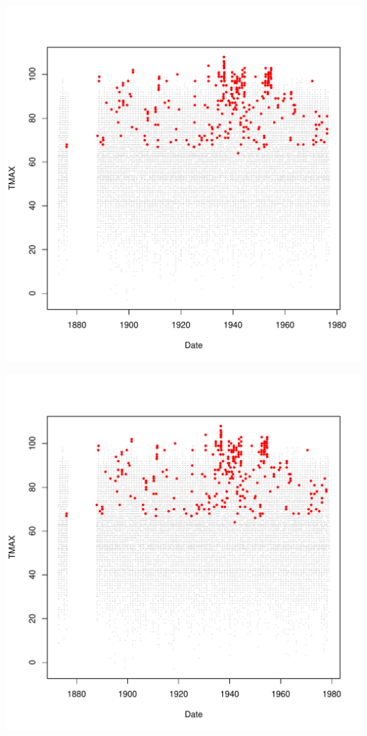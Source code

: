 \documentclass{article}\usepackage[]{graphicx}\usepackage[]{color}
\makeatletter
\def\maxwidth{ %
  \ifdim\Gin@nat@width>\linewidth
    \linewidth
  \else
    \Gin@nat@width
  \fi
}
\newenvironment{knitrout}{}{} %
\makeatother
\begin{document}
\begin{knitrout}
\includegraphics[width=\maxwidth]{figure/unnamed-chunk-4-48} 

\includegraphics[width=\maxwidth]{figure/unnamed-chunk-4-49} 


\end{knitrout}
\end{document}
